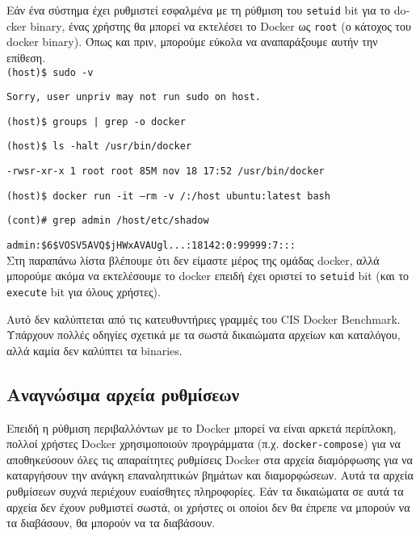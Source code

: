 Εάν ένα σύστημα έχει ρυθμιστεί εσφαλμένα με τη ρύθμιση του
\texttt{\textlatin{setuid}} \textlatin{bit} για το \textlatin{docker binary},
ένας χρήστης θα μπορεί να εκτελέσει το \textlatin{Docker} ως
\texttt{\textlatin{root}} (ο κάτοχος του \textlatin{docker binary}). Όπως και
πριν, μπορούμε εύκολα να αναπαράξουμε αυτήν την επίθεση. \\

\texttt{\textlatin{(host)\$ sudo -v}}

\texttt{\textlatin{Sorry, user unpriv may not run sudo on host.}}

\texttt{\textlatin{(host)\$ groups | grep -o docker}}

\texttt{\textlatin{(host)\$ ls -halt /usr/bin/docker}}

\texttt{\textlatin{-rwsr-xr-x 1 root root 85M nov 18 17:52 /usr/bin/docker}}

\texttt{\textlatin{(host)\$ docker run -it --rm -v /:/host ubuntu:latest bash}}

\texttt{\textlatin{(cont)\# grep admin /host/etc/shadow}}

\texttt{\textlatin{admin:\$6\$VOSV5AVQ\$jHWxAVAUgl...:18142:0:99999:7:::}} \\

Στη παραπάνω λίστα βλέπουμε ότι δεν είμαστε μέρος της ομάδας \textlatin{docker},
αλλά μπορούμε ακόμα να εκτελέσουμε το \textlatin{docker} επειδή  έχει οριστεί το
\texttt{\textlatin{setuid}} \textlatin{bit} (και το
\texttt{\textlatin{execute}} \textlatin{bit} για όλους χρήστες).

Αυτό δεν καλύπτεται από τις κατευθυντήριες γραμμές του
\textlatin{CIS Docker Benchmark}. Υπάρχουν πολλές οδηγίες σχετικά με τα σωστά
δικαιώματα αρχείων και καταλόγου, αλλά καμία δεν καλύπτει τα
\textlatin{binaries}.

\subsection{Αναγνώσιμα αρχεία ρυθμίσεων}

Επειδή η ρύθμιση περιβαλλόντων με το \textlatin{Docker} μπορεί να είναι
αρκετά περίπλοκη, πολλοί χρήστες \textlatin{Docker} χρησιμοποιούν προγράμματα
(π.χ. \texttt{\textlatin{docker-compose}}) για να αποθηκεύσουν όλες τις
απαραίτητες ρυθμίσεις \textlatin{Docker} στα αρχεία διαμόρφωσης για να
καταργήσουν την ανάγκη επαναληπτικών βημάτων και διαμορφώσεων. Αυτά τα αρχεία
ρυθμίσεων συχνά περιέχουν ευαίσθητες πληροφορίες. Εάν τα δικαιώματα σε αυτά τα
αρχεία δεν έχουν ρυθμιστεί σωστά, οι χρήστες οι οποίοι δεν θα έπρεπε να μπορούν
να τα διαβάσουν, θα μπορούν να τα διαβάσουν.

